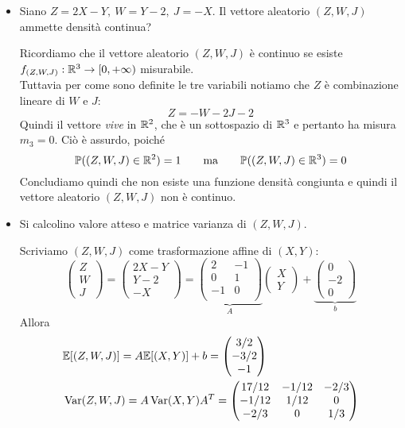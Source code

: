 \begin{itemize}
\item [(d)] Siano $Z=2X-Y,\ W=Y-2,\ J=-X$. Il vettore aleatorio $(Z,W,J)$ ammette densità continua?

Ricordiamo che il vettore aleatorio $(Z,W,J)$ è continuo se esiste $f_{(Z,W,J)}:\mathbb{R}^3\to[0,+\infty)$ misurabile. \\
Tuttavia per come sono definite le tre variabili notiamo che $Z$ è combinazione lineare di $W$ e $J$:
\[
Z=-W-2J-2
\]
Quindi il vettore \emph{vive} in $\mathbb{R}^2$, che è un sottospazio di $\mathbb{R}^3$ e pertanto ha misura $m_3=0$. Ciò è assurdo, poiché
\[
\mathbb{P}((Z,W,J)\in\mathbb{R}^2)=1\qquad\text{ma}\qquad\mathbb{P}((Z,W,J)\in\mathbb{R}^3)=0
\]
Concludiamo quindi che non esiste una funzione densità congiunta e quindi il vettore aleatorio $(Z,W,J)$ non è continuo.

\item [(e)] Si calcolino valore atteso e matrice varianza di $(Z,W,J)$.

Scriviamo $(Z,W,J)$ come trasformazione affine di $(X,Y)$:
\[
\begin{pmatrix}
Z \\
W \\ J
\end{pmatrix}=
\begin{pmatrix}
2X-Y \\Y-2
 \\-X
\end{pmatrix} =\underbrace{\begin{pmatrix}
2 & -1 \\
 0&1  \\
 -1&0  \\
\end{pmatrix}}_{A}\begin{pmatrix}
X \\
Y
\end{pmatrix}+\underbrace{\begin{pmatrix}
0 \\
-2 \\ 0
\end{pmatrix}}_{b}
\]
Allora
\begin{gather*}
\begin{aligned}
&\mathbb{E}[(Z,W,J)]=A\mathbb{E}[(X,Y)]+b=\begin{pmatrix} 3/2 \\ -3/2  \\-1 \end{pmatrix}   \\
&\operatorname{Var}(Z,W,J)=A\operatorname{Var}(X,Y)A^T=\begin{pmatrix}
17/12 & -1/12 & -2/3 \\
-1/12 &  1/12& 0 \\
 -2/3& 0 & 1/3 \\
\end{pmatrix}
\end{aligned}
\end{gather*}


\end{itemize}
